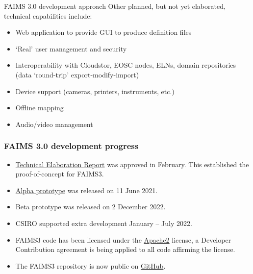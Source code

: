 

\begin{frame}{FAIMS 3.0 development approach}
Other planned, but not yet elaborated, technical capabilities include:
    \begin{itemize}
        \item Web application to provide GUI to produce definition files
        \item `Real' user management and security
        \item Interoperability with Cloudstor, EOSC nodes, ELNs, domain repositories (data `round-trip' export-modify-import)
        \item Device support (cameras, printers, instruments, etc.)
        \item Offline mapping
        \item Audio/video management
    \end{itemize}
\end{frame}


\begin{frame}
    \frametitle{FAIMS 3.0 development progress}
        \begin{itemize}
            \item \href{https://docs.google.com/document/d/13eTN8jhJa3Pgs9GOdo7r4jtIQcskNo7ikxJcBDBKHzw/edit}{Technical Elaboration Report} was approved in February. This established the proof-of-concept for FAIMS3. 
          \item \href{https://github.com/FAIMS/FAIMS3/releases/tag/v0.1.0-alpha}{Alpha prototype} was released on 11 June 2021. 
          \item Beta prototype was released on 2 December 2022.
        \item CSIRO supported extra development January -- July 2022.
        \item FAIMS3 code has been licensed under the \href{https://www.apache.org/licenses/LICENSE-2.0}{Apache2} license, a Developer Contribution agreement is being applied to all code affirming the license. 
        \item The FAIMS3 repository is now public on \href{https://github.com/FAIMS/FAIMS3}{GitHub}.

  \end{itemize}



\end{frame} 